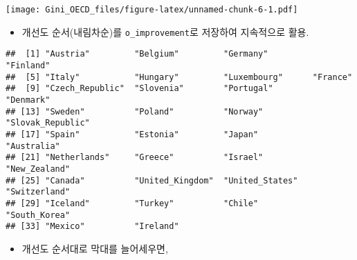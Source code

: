\documentclass[
]{article}
\newenvironment{Shaded}{\begin{snugshade}}{\end{snugshade}}
\newcommand{\AttributeTok}[1]{\textcolor[rgb]{0.77,0.63,0.00}{#1}}
\newcommand{\ConstantTok}[1]{\textcolor[rgb]{0.00,0.00,0.00}{#1}}
\newcommand{\DecValTok}[1]{\textcolor[rgb]{0.00,0.00,0.81}{#1}}
\newcommand{\FunctionTok}[1]{\textcolor[rgb]{0.00,0.00,0.00}{#1}}
\newcommand{\NormalTok}[1]{#1}
\newcommand{\OtherTok}[1]{\textcolor[rgb]{0.56,0.35,0.01}{#1}}
\newcommand{\SpecialCharTok}[1]{\textcolor[rgb]{0.00,0.00,0.00}{#1}}
\providecommand{\tightlist}{%
  \setlength{\itemsep}{0pt}\setlength{\parskip}{0pt}}
\begin{document}
\begin{Shaded}
\end{Shaded}

\texttt{[image: Gini\_OECD\_files/figure-latex/unnamed-chunk-6-1.pdf]}

\begin{itemize}
\tightlist
\item
  개선도 순서(내림차순)를 \texttt{o\_improvement}로 저장하여 지속적으로
  활용.
\end{itemize}

\begin{Shaded}
\end{Shaded}

\begin{verbatim}
##  [1] "Austria"         "Belgium"         "Germany"         "Finland"        
##  [5] "Italy"           "Hungary"         "Luxembourg"      "France"         
##  [9] "Czech_Republic"  "Slovenia"        "Portugal"        "Denmark"        
## [13] "Sweden"          "Poland"          "Norway"          "Slovak_Republic"
## [17] "Spain"           "Estonia"         "Japan"           "Australia"      
## [21] "Netherlands"     "Greece"          "Israel"          "New_Zealand"    
## [25] "Canada"          "United_Kingdom"  "United_States"   "Switzerland"    
## [29] "Iceland"         "Turkey"          "Chile"           "South_Korea"    
## [33] "Mexico"          "Ireland"
\end{verbatim}

\begin{itemize}
\tightlist
\item
  개선도 순서대로 막대를 늘어세우면,
\end{itemize}
\end{document}
